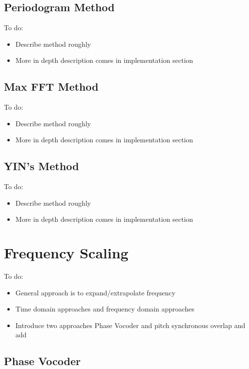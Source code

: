 \subsection{Periodogram Method}

\color{red}
To do:
\begin{itemize}
	\item Describe method roughly
	\item More in depth description comes in implementation section
\end{itemize}
\color{black}

\subsection{Max FFT Method}

\color{red}
To do:
\begin{itemize}
	\item Describe method roughly
	\item More in depth description comes in implementation section
\end{itemize}
\color{black}

\subsection{YIN's Method}

\color{red}
To do:
\begin{itemize}
	\item Describe method roughly
	\item More in depth description comes in implementation section
\end{itemize}
\color{black}

\section{Frequency Scaling}

\color{red}
To do:
\begin{itemize}
	\item General approach is to expand/extrapolate frequency
	\item Time domain approaches and frequency domain approaches
	\item Introduce two approaches Phase Vocoder and pitch synchronous overlap and add
\end{itemize}
\color{black}

\subsection{Phase Vocoder}

